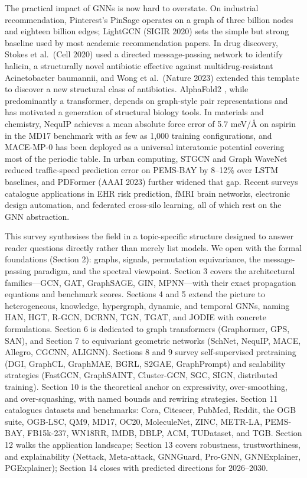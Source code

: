 \documentclass{article}
\begin{document}
The practical impact of GNNs is now hard to overstate. On industrial recommendation, Pinterest's PinSage operates on a graph of three billion nodes and eighteen billion edges; LightGCN (SIGIR 2020) sets the simple but strong baseline used by most academic recommendation papers. In drug discovery, Stokes et al.~(Cell 2020) used a directed message-passing network to identify halicin, a structurally novel antibiotic effective against multidrug-resistant Acinetobacter baumannii, and Wong et al.~(Nature 2023) extended this template to discover a new structural class of antibiotics. AlphaFold2 \citep{jumper20212021}, while predominantly a transformer, depends on graph-style pair representations and has motivated a generation of structural biology tools. In materials and chemistry, NequIP achieves a mean absolute force error of 5.7 meV/Å on aspirin in the MD17 benchmark with as few as 1,000 training configurations, and MACE-MP-0 has been deployed as a universal interatomic potential covering most of the periodic table. In urban computing, STGCN \citep{yu2018spatiotemporalgrap} and Graph WaveNet \citep{wu2019graphwavenetfordee} reduced traffic-speed prediction error on PEMS-BAY by 8--12\% over LSTM baselines, and PDFormer (AAAI 2023) further widened that gap. Recent surveys catalogue applications in EHR risk prediction, fMRI brain networks, electronic design automation, and federated cross-silo learning, all of which rest on the GNN abstraction.

This survey synthesises the field in a topic-specific structure designed to answer reader questions directly rather than merely list models. We open with the formal foundations (Section 2): graphs, signals, permutation equivariance, the message-passing paradigm, and the spectral viewpoint. Section 3 covers the architectural families---GCN, GAT, GraphSAGE, GIN, MPNN---with their exact propagation equations and benchmark scores. Sections 4 and 5 extend the picture to heterogeneous, knowledge, hypergraph, dynamic, and temporal GNNs, naming HAN, HGT, R-GCN, DCRNN, TGN, TGAT, and JODIE with concrete formulations. Section 6 is dedicated to graph transformers (Graphormer, GPS, SAN), and Section 7 to equivariant geometric networks (SchNet, NequIP, MACE, Allegro, CGCNN, ALIGNN). Sections 8 and 9 survey self-supervised pretraining (DGI, GraphCL, GraphMAE, BGRL, S2GAE, GraphPrompt) and scalability strategies (FastGCN, GraphSAINT, Cluster-GCN, SGC, SIGN, distributed training). Section 10 is the theoretical anchor on expressivity, over-smoothing, and over-squashing, with named bounds and rewiring strategies. Section 11 catalogues datasets and benchmarks: Cora, Citeseer, PubMed, Reddit, the OGB suite, OGB-LSC, QM9, MD17, OC20, MoleculeNet, ZINC, METR-LA, PEMS-BAY, FB15k-237, WN18RR, IMDB, DBLP, ACM, TUDataset, and TGB. Section 12 walks the application landscape; Section 13 covers robustness, trustworthiness, and explainability (Nettack, Meta-attack, GNNGuard, Pro-GNN, GNNExplainer, PGExplainer); Section 14 closes with predicted directions for 2026--2030.
\end{document}
